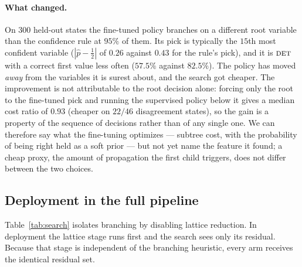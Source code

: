 \documentclass[final,5p,times,twocolumn]{elsarticle}
\newcommand{\FORCED}{\textsc{det}}
\begin{document}
\paragraph{What changed.} On $300$ held-out states the fine-tuned policy branches on a different root variable than the confidence rule at $95\%$ of them. Its pick is typically the $15$th most confident variable ($|\hat p-\tfrac12|$ of $0.26$ against $0.43$ for the rule's pick), and it is $\FORCED$ with a correct first value less often ($57.5\%$ against $82.5\%$). The policy has moved \emph{away} from the variables it is surest about, and the search got cheaper. The improvement is not attributable to the root decision alone: forcing only the root to the fine-tuned pick and running the supervised policy below it gives a median cost ratio of $0.93$ (cheaper on $22/46$ disagreement states), so the gain is a property of the sequence of decisions rather than of any single one. We can therefore say what the fine-tuning optimizes --- subtree cost, with the probability of being right held as a soft prior --- but not yet name the feature it found; a cheap proxy, the amount of propagation the first child triggers, does not differ between the two choices.

\subsection{Deployment in the full pipeline}
\label{sec:exp-cascade}

Table~\ref{tab:search} isolates branching by disabling lattice reduction. In deployment the lattice stage runs first and the search sees only its residual. Because that stage is independent of the branching heuristic, every arm receives the identical residual set.
\end{document}
